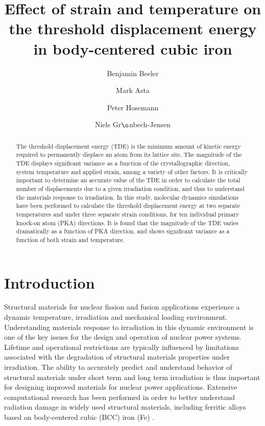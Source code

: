\documentclass[review]{elsarticle}
\begin{document}
\begin{frontmatter}
\title{Effect of strain and temperature on the threshold displacement energy in body-centered cubic iron}

\author[davisa,berka]{Benjamin Beeler}
\author[berka]{Mark Asta}
\author[berkb]{Peter Hosemann}
\author[davisa,davisb]{Niels Gr$\o$nbech-Jensen}
\address[davisa]{Department of Mechanical and Aerospace Engineering, University of California, Davis, CA 95616}
\address[berka]{Department of Materials Science, University of California, Berkeley, CA 94720}
\address[berkb]{Department of Nuclear Engineering, University of California, Berkeley, CA 94720}
\address[davisb]{Department of Mathematics, University of California, Davis, CA 95616}

\begin{abstract}
The threshold displacement energy (TDE) is the minimum amount of kinetic energy required to permanently displace an atom from its lattice site.  The magnitude of the TDE displays significant variance as a function of the crystallographic direction, system temperature and applied strain, among a variety of other factors.  It is critically important to determine an accurate value of the TDE in order to calculate the total number of displacements due to a given irradiation condition, and thus to understand the materials response to irradiation.  In this study, molecular dynamics simulations have been performed to calculate the threshold displacement energy at two separate temperatures and under three separate strain conditions, for ten individual primary knock-on atom (PKA) directions.  It is found that the magnitude of the TDE varies dramatically as a function of PKA direction, and shows significant variance as a function of both strain and temperature.
\end{abstract}
\end{frontmatter}

\linenumbers

\section{Introduction}

Structural materials for nuclear fission and fusion applications experience a dynamic temperature, irradiation and mechanical loading environment.  Understanding materials response to irradiation in this dynamic environment is one of the key issues for the design and operation of nuclear power systems.  Lifetime and operational restrictions are typically influenced by limitations associated with the degradation of structural materials properties under irradiation.  The ability to accurately predict and understand behavior of structural materials under short term and long term irradiation is thus important for designing improved materials for nuclear power applications.  Extensive computational research has been performed in order to better understand radiation damage in widely used structural materials, including ferritic alloys based on body-centered cubic (BCC) iron (Fe) \cite{bacon1993, stoller1996, gao1996, gao1997, becquart1997, stoller1999, malerba2006}.  
\end{document}
